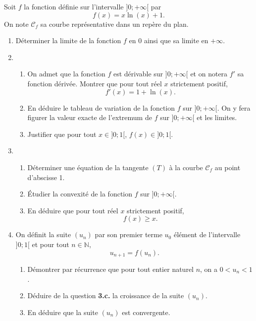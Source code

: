 \documentclass[11pt,fleqn, openany]{book} %
\begin{document}
\begin{exercise}[topic=cvx04, subtitle={(Centres étrangers 2022)}]
Soit $f$ la fonction définie sur l'intervalle $]0;+\infty[$ par
\[f(x)=x\ln(x)+1.\]
On note $\mathcal{C}_f$ sa courbe représentative dans un repère du plan.
\begin{enumerate}
\item Déterminer la limite de la fonction $f$ en 0 ainsi que sa limite en $+\infty$.
\item \begin{enumerate}
\item On admet que la fonction $f$ est dérivable sur $]0;+\infty[$ et on notera $f'$ sa fonction dérivée. Montrer que pour tout réel $x$ strictement positif,
\[f'(x)=1+\ln(x).\]
\item En déduire le tableau de variation de la fonction $f$ sur $]0;+\infty[$. On y fera figurer la valeur exacte de l'extremum de $f$ sur $]0;+\infty[$ et les limites.
\item Justifier que pour tout $x\in]0;1[$, $f(x)\in]0;1[$.
\end{enumerate}
\item \begin{enumerate} 
\item Déterminer une équation de la tangente $(T)$ à la courbe $\mathcal{C}_f$ au point d'abscisse 1.
\item Étudier la convexité de la fonction $f$ sur $]0;+\infty[$.
\item En déduire que pour tout réel $x$ strictement positif,
\[f(x)\geqslant x.\]\end{enumerate}
\item On définit la suite $(u_n)$ par son premier terme $u_0$ élément de l'intervalle $]0;1[$ et pour tout $n\in\mathbb{N}$,
\[u_{n+1}=f(u_n).\]
\begin{enumerate}
\item Démontrer par récurrence que pour tout entier naturel $n$, on a $0<u_n<1$.
\item Déduire de la question \textbf{3.c.} la croissance de la suite $(u_n)$.
\item En déduire que la suite $(u_n)$ est convergente.
\end{enumerate}
\end{enumerate}
\newpage
\end{exercise}
\end{document}

